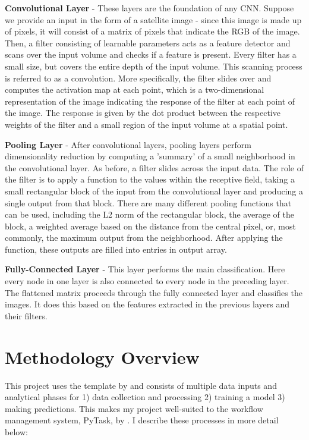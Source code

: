 \documentclass[11pt, a4paper, leqno]{article}
\begin{document}
\textbf{Convolutional Layer} - These layers are the foundation of any CNN. Suppose we provide an input in the form of a satellite image - since this image is made up of pixels, it will consist of a matrix of pixels that indicate the RGB of the image. Then, a filter consisting of learnable parameters acts as a feature detector and scans over the input volume and checks if a feature is present. Every filter has a small size, but covers the entire depth of the input volume. This scanning process is referred to as a convolution. More specifically, the filter slides over and computes the activation map at each point, which is a two-dimensional representation of the image indicating the response of the filter at each point of the image. The response is given by the dot product between the respective weights of the filter and a small region of the input volume at a spatial point. 

\textbf{Pooling Layer} - After convolutional layers, pooling layers perform dimensionality reduction by computing a 'summary' of a small neighborhood in the convolutional layer. As before, a filter slides across the input data. The role of the filter is to apply a function to the values within the receptive field, taking a small rectangular block of the input from the convolutional layer and producing a single output from that block. There are many different pooling functions that can be used, including the L2 norm of the rectangular block, the average of the block, a weighted average based on the distance from the central pixel, or, most commonly, the maximum output from the neighborhood. After applying the function, these outputs are filled into entries in output array. 

\textbf{Fully-Connected Layer} - This layer performs the main classification. Here every node in one layer is also connected to every node in the preceding layer. The flattened matrix proceeds through the fully connected layer and classifies the images. It does this based on the features extracted in the previous layers and their filters.

\section{Methodology Overview} 
 This project uses the template by \citet{GaudeckerEconProjectTemplates} and consists of multiple data inputs and analytical phases for 1) data collection and processing 2) training a model 3) making predictions. This makes my project well-suited to the workflow management system, PyTask, by \citet{Raabe2020}. I describe these processes in more detail below:
\end{document}
